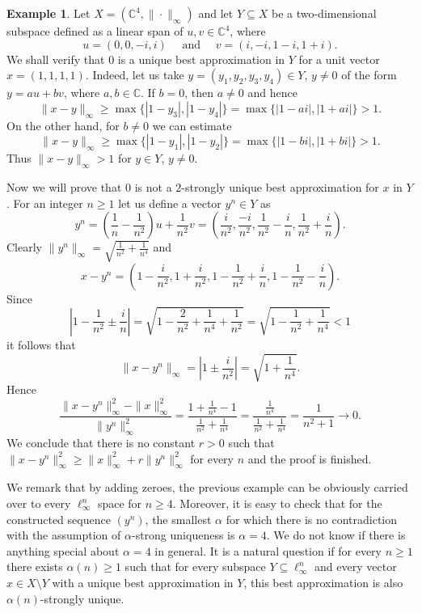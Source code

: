 \documentclass[12pt, reqno]{amsart}
\theoremstyle{definition}
\newtheorem{example}[twr]{Example}
\theoremstyle{remark}
\numberwithin{equation}{section}
\begin{document}
\begin{example}
\label{counterexample}
Let $X = (\mathbb{C}^4, \| \cdot \|_{\infty})$ and let $Y \subseteq X$ be a two-dimensional subspace defined as a linear span of $u, v \in \mathbb{C}^4$, where
$$u = (0, 0, -i, i) \quad \text { and } \quad  v = (i, -i, 1-i, 1+i).$$
We shall verify that $0$ is a unique best approximation in $Y$ for a unit vector $x=(1, 1, 1, 1)$. Indeed, let us take $y = (y_1, y_2, y_3, y_4) \in Y$, $y \neq 0$ of the form $y=au+bv$, where $a, b \in \mathbb{C}$. If $b=0$, then $a \neq 0$ and hence
$$\|x-y\|_{\infty} \geq \max \{|1-y_3|, |1-y_4| \} =  \max\{|1-ai|, |1+ai|\}>1.$$
On the other hand, for $b \neq 0$ we can estimate
$$\|x-y\|_{\infty} \geq \max \{|1-y_1|, |1-y_2|\} = \max \{|1-bi|, |1+bi| \}>1.$$
Thus $\|x-y\|_{\infty}>1$ for $y \in Y$, $y \neq 0$.

Now we will prove that $0$ is not a $2$-strongly unique best approximation for $x$ in $Y$. For an integer $n \geq 1$ let us define a vector $y^n \in Y$ as 
$$y^n=  \left (\frac{1}{n} - \frac{1}{n^2} \right )u + \frac{1}{n^2} v = \left ( \frac{i}{n^2}, \frac{-i}{n^2}, \frac{1}{n^2} - \frac{i}{n} , \frac{1}{n^2} + \frac{i}{n}  \right ) .$$ 
Clearly $\|y^n\|_{\infty}= \sqrt{\frac{1}{n^2} + \frac{1}{n^4}}$ and
$$x-y^n = \left ( 1 - \frac{i}{n^2}, 1 + \frac{i}{n^2}, 1 - \frac{1}{n^2} + \frac{i}{n}, 1 - \frac{1}{n^2} - \frac{i}{n} \right ).$$
Since 
$$\left | 1 - \frac{1}{n^2} \pm \frac{i}{n} \right | = \sqrt{1 - \frac{2}{n^2} + \frac{1}{n^4} + \frac{1}{n^2}} = \sqrt{1 - \frac{1}{n^2} + \frac{1}{n^4}} < 1$$
it follows that
$$\|x-y^n\|_{\infty} = \left  |1 \pm \frac{i}{n^2} \right | =  \sqrt{1 + \frac{1}{n^4}}.$$
Hence
$$\frac{\|x-y^n\|_{\infty}^2 - \|x\|_{\infty}^2}{\|y^n\|^2_{\infty}} = \frac{1 + \frac{1}{n^4} - 1}{\frac{1}{n^2} + \frac{1}{n^4}} = \frac{\frac{1}{n^4}}{\frac{1}{n^2} + \frac{1}{n^4}} = \frac{1}{n^2+1} \to 0.$$
We conclude that there is no constant $r>0$ such that $\|x-y^n\|_{\infty}^2 \geq \|x\|_{\infty}^2 + r \|y^n\|_{\infty}^2$ for every $n$ and the proof is finished.

\end{example}

We remark that by adding zeroes, the previous example can be obviously carried over to every $\ell_{\infty}^n$ space for $n \geq 4$. Moreover, it is easy to check that for the constructed sequence $(y^n)$, the smallest $\alpha$ for which there is no contradiction with the assumption of $\alpha$-strong uniqueness is $\alpha=4$. We do not know if there is anything special about $\alpha=4$ in general. It is a natural question if for every $n \geq 1$ there exists $\alpha(n) \geq 1$ such that for every subspace $Y \subseteq \ell_{\infty}^n$ and every vector $x \in X \setminus Y$ with a unique best approximation in $Y$, this best approximation is also $\alpha(n)$-strongly unique.
\end{document}
